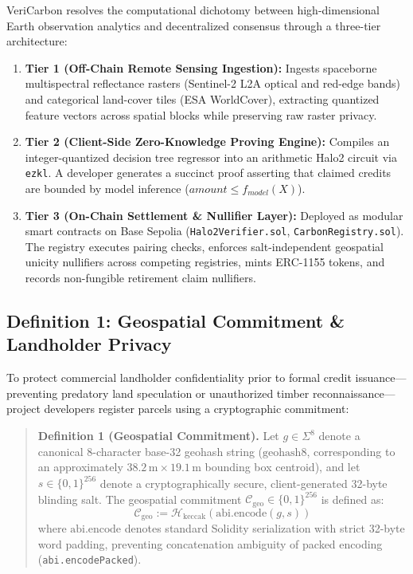 \documentclass[preprint,12pt]{elsarticle}
\begin{document}
VeriCarbon resolves the computational dichotomy between high-dimensional Earth observation analytics and decentralized consensus through a three-tier architecture:
\begin{enumerate}
\item \textbf{Tier 1 (Off-Chain Remote Sensing Ingestion):} Ingests spaceborne multispectral reflectance rasters (Sentinel-2 L2A optical and red-edge bands) and categorical land-cover tiles (ESA WorldCover), extracting quantized feature vectors across spatial blocks while preserving raw raster privacy.
\item \textbf{Tier 2 (Client-Side Zero-Knowledge Proving Engine):} Compiles an integer-quantized decision tree regressor into an arithmetic Halo2 circuit via \texttt{ezkl}. A developer generates a succinct proof asserting that claimed credits are bounded by model inference ($amount \le f_{model}(X)$).
\item \textbf{Tier 3 (On-Chain Settlement \& Nullifier Layer):} Deployed as modular smart contracts on Base Sepolia (\texttt{Halo2Verifier.sol}, \texttt{CarbonRegistry.sol}). The registry executes pairing checks, enforces salt-independent geospatial unicity nullifiers across competing registries, mints ERC-1155 tokens, and records non-fungible retirement claim nullifiers.
\end{enumerate}

\subsection{Definition 1: Geospatial Commitment \& Landholder Privacy}

To protect commercial landholder confidentiality prior to formal credit issuance—preventing predatory land speculation or unauthorized timber reconnaissance—project developers register parcels using a cryptographic commitment:

\begin{quote}
\textbf{Definition 1 (Geospatial Commitment).} Let $g \in \Sigma^8$ denote a canonical 8-character base-32 geohash string ($\text{geohash8}$, corresponding to an approximately $38.2\,\text{m} \times 19.1\,\text{m}$ bounding box centroid), and let $s \in \{0,1\}^{256}$ denote a cryptographically secure, client-generated 32-byte blinding salt. The geospatial commitment $\mathcal{C}_{\text{geo}} \in \{0,1\}^{256}$ is defined as:
$$\mathcal{C}_{\text{geo}} := \mathcal{H}_{\text{keccak}}(\text{abi.encode}(g, s))$$
where $\text{abi.encode}$ denotes standard Solidity serialization with strict 32-byte word padding, preventing concatenation ambiguity of packed encoding (\texttt{abi.encodePacked}).
\end{quote}
\end{document}
